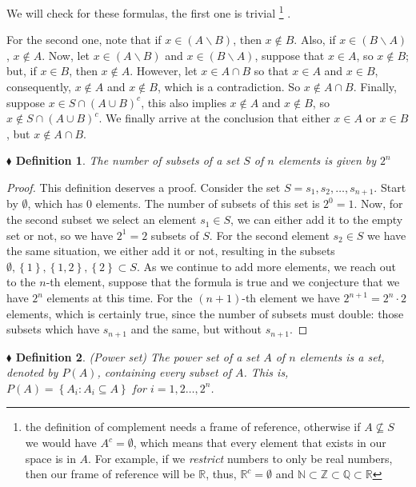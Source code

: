 \documentclass{report}
\newcommand*{\daggerfootnote}[1]{%
  \begingroup
  \renewcommand*{\thefootnote}{\fnsymbol{footnote}}%
  \footnote{#1}%
  \endgroup
}
\newtheorem{definition}{$\blacklozenge$ Definition}[chapter]
\begin{document}
We will check for these formulas, the first one is trivial \daggerfootnote{the definition of complement needs a frame of reference, otherwise if $A\nsubseteq S$
    we would have $A^{c} = \emptyset$, which means that every element that exists in our space is in $A$.
    For example, if we \textit{restrict} numbers to only be real numbers, then our frame of reference will
    be $\mathbb{R}$, thus, $\mathbb{R}^{c} = \emptyset$ and $\mathbb{N}\subset\mathbb{Z}\subset\mathbb{Q}\subset\mathbb{R}$}.

For the second one, note that if $x\in (A\backslash B)$,
then $x\notin B$. Also, if $x\in (B\backslash A)$, $x\notin A$. Now, let $x\in (A\backslash B)$ and $x\in (B \backslash A)$,
suppose that $x\in A$, so $x\notin B$; but, if $x\in B$, then $x\notin A$. However, let $x\in A\cap B$ so that $x\in A$ and $x\in B$,
consequently, $x\notin A$ and $x\notin B$, which is a contradiction. So $x\notin A\cap B$. Finally, suppose $x\in S\cap (A\cup B)^{c}$,
this also implies $x\notin A$ and $x \notin B$, so $x\notin S\cap(A\cup B)^{c}$. We finally arrive at the conclusion that
either $x\in A$ or $x\in B$, but $x\notin A\cap B$.

\begin{definition}
    The number of subsets of a set $S$ of $n$ elements is given by $2^{n}$
\end{definition}

\begin{proof}
    This definition deserves a proof. Consider the set $S = {s_1, s_2, \dots, s_{n+1}}$. 
    Start by $\emptyset$, which has $0$ elements. The number of subsets of this set is $2^{0} = 1$. 
    Now, for the second subset we select an element $s_1\in S$, we can
    either add it to the empty set or not, so we have $2^{1} = 2$ subsets of $S$. For the second element $s_2 \in S$ we have
    the same situation, we either add it or not, resulting in the subsets $\emptyset, \left\{1\right\}, \left\{1,2\right\}, \left\{2\right\}\subset S$.
    As we continue to add more elements, we reach out to the $n$-th element, suppose that the formula is true 
    and we conjecture that we have $2^{n}$ elements at this time. For the $(n+1)$-th element we have 
    $2^{n+1} = 2^{n}\cdot2$ elements, which is certainly true, since the number of subsets must double: those subsets
    which have $s_{n+1}$ and the same, but without $s_{n+1}$.
\end{proof}

\begin{definition} (Power set)
    The power set of a set $A$ of $n$ elements is a set, denoted by $P(A)$, containing every 
    subset of $A$. This is, $P(A) = \left\{A_i: A_i\subseteq A\right\}$ for $i=1,2\dots,2^{n}$.
\end{definition}
\end{document}
